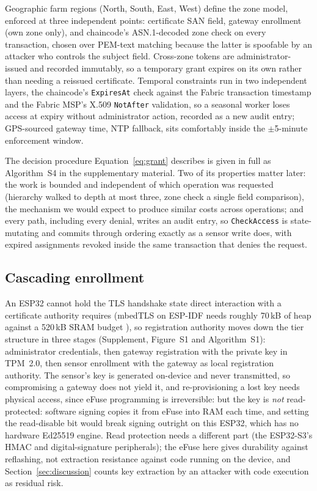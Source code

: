 \documentclass[a4paper,fleqn]{cas-sc}
\begin{document}
Geographic farm regions (North, South, East, West) define the zone model,
enforced at three independent points: certificate SAN field, gateway
enrollment (own zone only), and chaincode's ASN.1-decoded zone check on
every transaction, chosen over PEM-text matching because the latter is
spoofable by an attacker who controls the subject field. Cross-zone
tokens are administrator-issued and recorded immutably, so a temporary
grant expires on its own rather than needing a reissued certificate.
Temporal constraints run in two independent layers, the chaincode's
\texttt{ExpiresAt} check against the Fabric transaction timestamp and the
Fabric MSP's X.509 \texttt{NotAfter} validation, so a seasonal worker
loses access at expiry without administrator action, recorded as a new
audit entry; GPS-sourced gateway time, NTP fallback, sits comfortably
inside the $\pm$5-minute enforcement window.

The decision procedure Equation~\eqref{eq:grant} describes is given in
full as Algorithm~S4 in the supplementary material. Two of its properties
matter later: the work is bounded and independent of which operation was
requested (hierarchy walked to depth at most three, zone check a single
field comparison), the mechanism we would expect to produce similar costs
across operations; and every path, including every denial, writes an
audit entry, so \texttt{CheckAccess} is state-mutating and commits through
ordering exactly as a sensor write does, with expired assignments revoked
inside the same transaction that denies the request.

\subsection{Cascading enrollment}
\label{subsec:enrollment}

An ESP32 cannot hold the TLS handshake state direct interaction with a
certificate authority requires (mbedTLS on ESP-IDF needs roughly 70\,kB of
heap against a 520\,kB SRAM budget \cite{raza2013lithe}), so registration
authority moves down the tier structure in three stages (Supplement,
Figure~S1 and Algorithm~S1): administrator credentials, then gateway
registration with the private key in TPM~2.0, then sensor enrollment with
the gateway as local registration authority. The sensor's key is generated
on-device and never transmitted, so compromising a gateway does not yield
it, and re-provisioning a lost key needs physical access, since eFuse
programming is irreversible: but the key is \emph{not} read-protected:
software signing copies it from eFuse into RAM each time, and setting the
read-disable bit would break signing outright on this ESP32, which has no
hardware Ed25519 engine. Read protection needs a different part (the
ESP32-S3's HMAC and digital-signature peripherals); the eFuse here gives
durability against reflashing, not extraction resistance against code
running on the device, and Section~\ref{sec:discussion} counts key
extraction by an attacker with code execution as residual risk.
\end{document}
